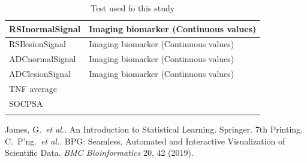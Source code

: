 \documentclass[]{article}
\begin{document}
\begin{longtable}{| p{} | p{} |}
\hline
RSInormalSignal          &    Imaging biomarker (Continuous values) \\
\hline
RSIlesionSignal          &    Imaging biomarker (Continuous values) \\
\hline
ADCnormalSignal          &    Imaging biomarker (Continuous values) \\
\hline
ADClesionSignal          &    Imaging biomarker (Continuous values) \\
\hline
TNF average              & \\
\hline                   
SOCPSA                   & \\
\hline
\caption{Test used fo this study}
\label{tab:info}
\end{longtable}

\begin{thebibliography}{}
  James, G.~{\textit{et al.}}. An Introduction to Statistical Learning. Springer. 7th Printing.
C.~P'ng.~{\textit{et al.}}. BPG: Seamless, Automated and Interactive Visualization of Scientific Data.
\textit{BMC Bioinformatics} 20, 42 (2019).\\

\end{thebibliography}
\end{document}
